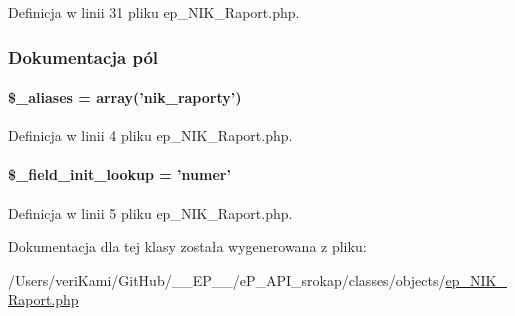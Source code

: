Definicja w linii 31 pliku ep\-\_\-\-N\-I\-K\-\_\-\-Raport.\-php.



\subsubsection{Dokumentacja pól}
\hypertarget{classep___n_i_k__raport_ab4e31d75f0bc5d512456911e5d01366b}{
\paragraph[{\$\-\_\-aliases}]{\setlength{\rightskip}{0pt plus 5cm}\$\-\_\-aliases = array('nik\-\_\-raporty')}}\label{classep___n_i_k__raport_ab4e31d75f0bc5d512456911e5d01366b}


Definicja w linii 4 pliku ep\-\_\-\-N\-I\-K\-\_\-\-Raport.\-php.

\hypertarget{classep___n_i_k__raport_a4a4d54ae35428077a7c61ec8a5139af3}{
\paragraph[{\$\-\_\-field\-\_\-init\-\_\-lookup}]{\setlength{\rightskip}{0pt plus 5cm}\$\-\_\-field\-\_\-init\-\_\-lookup = 'numer'}}\label{classep___n_i_k__raport_a4a4d54ae35428077a7c61ec8a5139af3}


Definicja w linii 5 pliku ep\-\_\-\-N\-I\-K\-\_\-\-Raport.\-php.



Dokumentacja dla tej klasy została wygenerowana z pliku\-:\begin{DoxyCompactItemize}
\item 
/\-Users/veri\-Kami/\-Git\-Hub/\-\_\-\-\_\-\-E\-P\-\_\-\-\_\-/e\-P\-\_\-\-A\-P\-I\-\_\-srokap/classes/objects/\hyperlink{ep___n_i_k___raport_8php}{ep\-\_\-\-N\-I\-K\-\_\-\-Raport.\-php}\end{DoxyCompactItemize}
